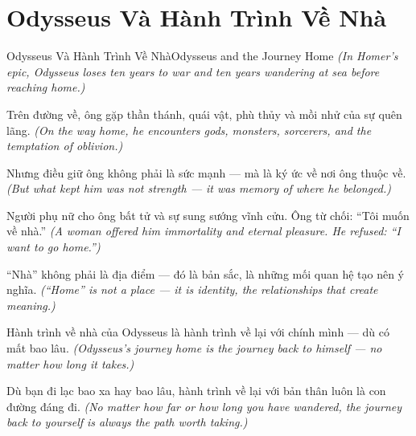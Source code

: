 \section{Odysseus Và Hành Trình Về Nhà}
\begin{truyen}{Odysseus Và Hành Trình Về Nhà}{Odysseus and the Journey Home}
\textit{(In Homer's epic, Odysseus loses ten years to war and ten years wandering at sea before reaching home.)}

Trên đường về, ông gặp thần thánh, quái vật, phù thủy và mồi nhử của sự quên lãng.
\textit{(On the way home, he encounters gods, monsters, sorcerers, and the temptation of oblivion.)}

Nhưng điều giữ ông không phải là sức mạnh — mà là ký ức về nơi ông thuộc về.
\textit{(But what kept him was not strength — it was memory of where he belonged.)}

Người phụ nữ cho ông bất tử và sự sung sướng vĩnh cửu. Ông từ chối: ``Tôi muốn về nhà.''
\textit{(A woman offered him immortality and eternal pleasure. He refused: ``I want to go home.'')}

``Nhà'' không phải là địa điểm — đó là bản sắc, là những mối quan hệ tạo nên ý nghĩa.
\textit{(``Home'' is not a place — it is identity, the relationships that create meaning.)}

Hành trình về nhà của Odysseus là hành trình về lại với chính mình — dù có mất bao lâu.
\textit{(Odysseus's journey home is the journey back to himself — no matter how long it takes.)}

\end{truyen}

\begin{baihoc}
Dù bạn đi lạc bao xa hay bao lâu, hành trình về lại với bản thân luôn là con đường đáng đi.
\textit{(No matter how far or how long you have wandered, the journey back to yourself is always the path worth taking.)}
\end{baihoc}
\ngancach

